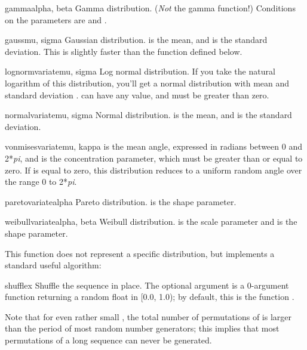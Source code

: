 \begin{funcdesc}{gamma}{alpha, beta}
Gamma distribution.  (\emph{Not} the gamma function!)  Conditions on
the parameters are  and .
\end{funcdesc}

\begin{funcdesc}{gauss}{mu, sigma}
Gaussian distribution.   is the mean, and  is the
standard deviation.  This is slightly faster than the
 function defined below.
\end{funcdesc}

\begin{funcdesc}{lognormvariate}{mu, sigma}
Log normal distribution.  If you take the natural logarithm of this
distribution, you'll get a normal distribution with mean  and
standard deviation .   can have any value, and
 must be greater than zero.  
\end{funcdesc}

\begin{funcdesc}{normalvariate}{mu, sigma}
Normal distribution.   is the mean, and  is the
standard deviation.
\end{funcdesc}

\begin{funcdesc}{vonmisesvariate}{mu, kappa}
 is the mean angle, expressed in radians between 0 and 2*\emph{pi},
and  is the concentration parameter, which must be greater
than or equal to zero.  If  is equal to zero, this
distribution reduces to a uniform random angle over the range 0 to
2*\emph{pi}.
\end{funcdesc}

\begin{funcdesc}{paretovariate}{alpha}
Pareto distribution.   is the shape parameter.
\end{funcdesc}

\begin{funcdesc}{weibullvariate}{alpha, beta}
Weibull distribution.   is the scale parameter and
 is the shape parameter.
\end{funcdesc}


This function does not represent a specific distribution, but
implements a standard useful algorithm:

\begin{funcdesc}{shuffle}{x}
Shuffle the sequence  in place.
The optional argument  is a 0-argument function returning
a random float in [0.0, 1.0); by default, this is the function
.

Note that for even rather small , the total number
of permutations of  is larger than the period of most random
number generators; this implies that most permutations of a long
sequence can never be generated.
\end{funcdesc}


